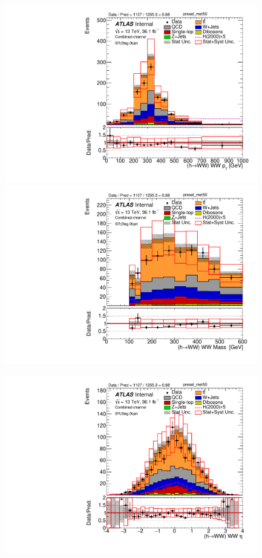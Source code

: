 \begin{figure}[!h]
\begin{center}
\includegraphics[scale=0.33]{./figures/boosted/PlotsInMbbSR/Unblinded/DataMC_2tag_0bjet_SR_lepton_presel_met50_WWPt}
\includegraphics[scale=0.33]{./figures/boosted/PlotsInMbbSR/Unblinded/DataMC_2tag_0bjet_SR_lepton_presel_met50_WWMass}\\
\par\medskip
\includegraphics[scale=0.33]{./figures/boosted/PlotsInMbbSR/Unblinded/DataMC_2tag_0bjet_SR_lepton_presel_met50_WWEta}

\end{center}
\end{figure}
